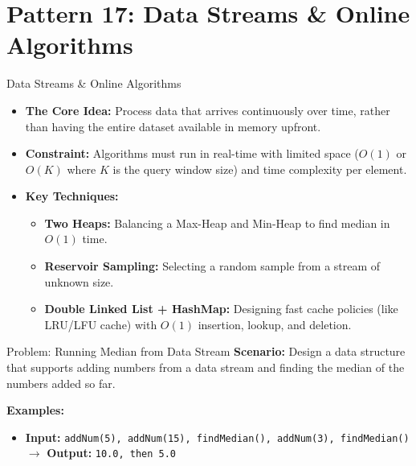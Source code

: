 \section{Pattern 17: Data Streams \& Online Algorithms}

\begin{frame}[c]{\empty}
    \begin{center}
        \Large\textbf{\secname}
    \end{center}
\end{frame}

\begin{frame}{Data Streams \& Online Algorithms}
  \begin{itemize}
    \item \textbf{The Core Idea:} Process data that arrives continuously over time, rather than having the entire dataset available in memory upfront.
    \item \textbf{Constraint:} Algorithms must run in real-time with limited space ($O(1)$ or $O(K)$ where $K$ is the query window size) and time complexity per element.
    \item \textbf{Key Techniques:}
      \begin{itemize}
        \item \textbf{Two Heaps:} Balancing a Max-Heap and Min-Heap to find median in $O(1)$ time.
        \item \textbf{Reservoir Sampling:} Selecting a random sample from a stream of unknown size.
        \item \textbf{Double Linked List + HashMap:} Designing fast cache policies (like LRU/LFU cache) with $O(1)$ insertion, lookup, and deletion.
      \end{itemize}
  \end{itemize}
\end{frame}

\begin{frame}[fragile]{Problem: Running Median from Data Stream}
  \textbf{Scenario:}
  Design a data structure that supports adding numbers from a data stream and finding the median of the numbers added so far.
  
  \vspace{0.3cm}
  \textbf{Examples:}
  \begin{itemize}
    \item \textbf{Input:} \texttt{addNum(5), addNum(15), findMedian(), addNum(3), findMedian()} $\rightarrow$ \textbf{Output:} \texttt{10.0, then 5.0}
  \end{itemize}
\end{frame}

